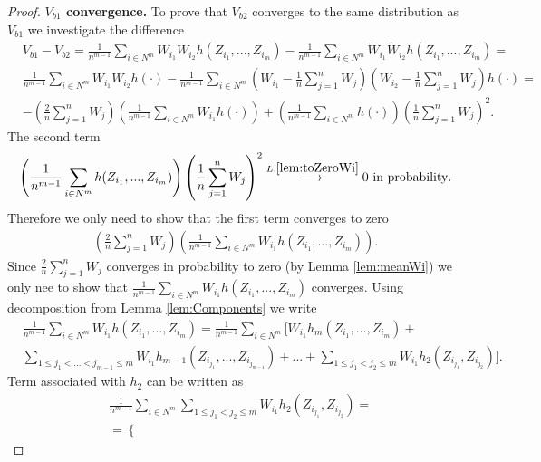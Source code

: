 \begin{proof}
\textbf{$V_{b1}$ convergence.} To prove that  $V_{b2}$ converges to the same distribution as $V_{b1}$ we investigate the difference
\begin{align}
&V_{b1} - V_{b2} = \frac{1} {n^{m-1}} \sum_{i \in N^m} W_{i_1}W_{i_2} h(Z_{i_1},...,Z_{i_m}) - \frac{1} {n^{m-1}} \sum_{i \in N^m} \tilde W_{i_1} \tilde W_{i_2} h(Z_{i_1},...,Z_{i_m}) = \\
&\frac{1} {n^{m-1}} \sum_{i \in N^m} W_{i_1}W_{i_2} h(\cdot) - \frac{1} {n^{m-1}} \sum_{i \in N^m}  (W_{i_1} -\frac 1 n \sum_{j=1}^n W_j ) (W_{i_2} -\frac 1 n \sum_{j=1}^n W_j ) h(\cdot) = \\
&-\left(\frac 2 n \sum_{j=1}^n W_j \right) \left( \frac{1} {n^{m-1}} \sum_{i \in N^{m}} W_{i_1} h(\cdot) \right)  + \left(\frac{1} {n^{m-1}} \sum_{i \in N^{m}}  h(\cdot) \right) \left(\frac 1 n \sum_{j=1}^n W_j \right)^2.
\end{align} 
The second term
\begin{align}
\left(\frac{1} {n^{m-1}} \sum_{i \in N^{m}}  h(Z_{i_1},...,Z_{i_m}) \right) \left(\frac 1 n \sum_{j=1}^n W_j \right)^2 \overset{L. \ref{lem:toZeroWi}}{\longrightarrow} 0 \text{ in probability}.
\end{align}
Therefore we only need to show that the first term converges to zero
\begin{align}
\label{eq:firstTerm}
\left(\frac 2 n \sum_{j=1}^n W_j \right) \left( \frac{1} {n^{m-1}} \sum_{i \in N^{m}} W_{i_1} h(Z_{i_1},...,Z_{i_m}) \right).
\end{align}
Since $\frac 2 n \sum_{j=1}^n W_j$ converges in probability to zero (by Lemma \ref{lem:meanWi}) we only nee to show that $\frac{1} {n^{m-1}} \sum_{i \in N^{m}} W_{i_1} h(Z_{i_1},...,Z_{i_m})$ converges. Using decomposition from Lemma \ref{lem:Components} we write
\begin{align}
\label{eq:xyz}
&\frac{1} {n^{m-1}} \sum_{i \in N^{m}} W_{i_1} h(Z_{i_1},...,Z_{i_m}) =\frac{1} {n^{m-1}}  \sum_{i \in N^m}  \Big[ W_{i_1}    h_m(Z_{i_1},...,Z_{i_m})  + \\ 
 & \sum_{1 \leq j_1 < ...<j_{m-1} \leq m } W_{i_1}  h_{m-1}(Z_{i_{j_1}},...,Z_{i_{j_{m-1}}})   + ... + \sum_{1 \leq j_1 < j_2 \leq m } W_{i_1}  h_2(Z_{i_{j_1}},Z_{i_{j_2}}) \Big].
\end{align}
Term associated with $h_2$ can be written as
\begin{align}
&\frac{1} {n^{m-1}} \sum_{i \in N^{m}} \sum_{1 \leq j_1 < j_2 \leq m } W_{i_1}  h_2(Z_{i_{j_1}},Z_{i_{j_2}}) = \\
&= \left\{
 \begin{array}{lr}

\end{array}
\end{align}
\end{proof}

